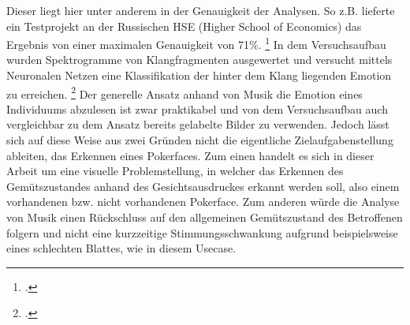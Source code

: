 \documentclass[12pt, a4paper]{scrbook}
\begin{document}
Dieser liegt hier unter anderem in der Genauigkeit der Analysen. So z.B. lieferte ein Testprojekt an der Russischen HSE (Higher School of Economics) das Ergebnis von einer maximalen Genauigkeit von 71\%.
\footcite[Vgl. ][Abstract]{EmotionInSound}
In dem Versuchsaufbau wurden Spektrogramme von Klangfragmenten ausgewertet und versucht mittels Neuronalen Netzen eine Klassifikation der hinter dem Klang liegenden Emotion zu erreichen.
\footcite[Vgl. ][Abstract]{EmotionInSound}
Der generelle Ansatz anhand von Musik die Emotion eines Individuums abzulesen ist zwar praktikabel und von dem Versuchsaufbau auch vergleichbar zu dem Ansatz bereits gelabelte Bilder zu verwenden. Jedoch lässt sich auf diese Weise aus zwei Gründen nicht die eigentliche Zielaufgabenstellung ableiten, das Erkennen eines Pokerfaces. Zum einen handelt es sich in dieser Arbeit um eine visuelle Problemstellung, in welcher das Erkennen des Gemütszustandes anhand des Gesichtsausdruckes erkannt werden soll, also einem vorhandenen bzw. nicht vorhandenen Pokerface. Zum anderen würde die Analyse von Musik einen Rückschluss auf den allgemeinen Gemütszustand des Betroffenen folgern und nicht eine kurzzeitige Stimmungsschwankung aufgrund beispielsweise eines schlechten Blattes, wie in diesem Usecase.

\let\cleardoublepage\relax
\newpage

\printbibheading
\printbibliography[type=book,heading=subbibliography,title={Literaturquellen}]
\pagestyle{empty}
\printbibliography[type=misc,heading=subbibliography,title={Sonstige Quellen}]
\pagestyle{empty}
\newpage
\pagestyle{empty}
\end{document}
